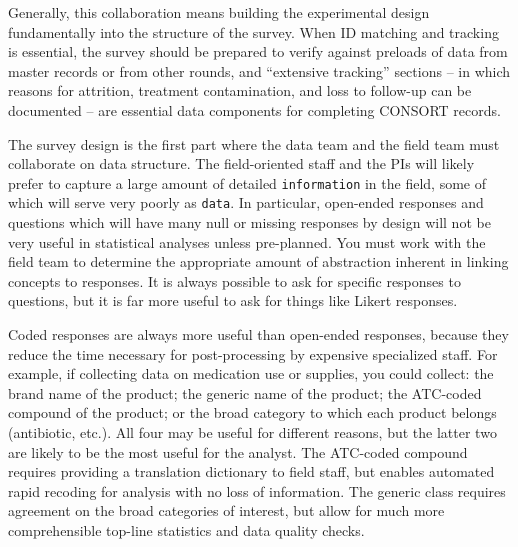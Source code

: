 Generally, this collaboration means building the experimental design
fundamentally into the structure of the survey.
When ID matching and tracking is essential,
the survey should be prepared to verify against preloads
of data from master records or from other rounds,
and ``extensive tracking'' sections --
in which reasons for attrition, treatment contamination, and
loss to follow-up can be documented --
are essential data components for completing CONSORT records.\cite{begg1996improving}

The survey design is the first part where the data team
and the field team must collaborate on data structure.
The field-oriented staff and the PIs will likely prefer
to capture a large amount of detailed \texttt{information}
in the field, some of which will serve very poorly as \texttt{data}.
In particular, open-ended responses and questions which will have
many null or missing responses by design will not be very useful
in statistical analyses unless pre-planned.
You must work with the field team to determine the appropriate amount
of abstraction inherent in linking concepts to responses.
It is always possible to ask for specific responses to questions,
but it is far more useful to ask for things like Likert responses.

Coded responses are always more useful than open-ended responses,
because they reduce the time necessary for post-processing by
expensive specialized staff.
For example, if collecting data on medication use or supplies,
you could collect: the brand name of the product;
the generic name of the product;
the ATC-coded compound of the product;
or the broad category to which each product belongs (antibiotic, etc.).
All four may be useful for different reasons,
but the latter two are likely to be the most useful for the analyst.
The ATC-coded compound requires providing a translation dictionary
to field staff, but enables automated rapid recoding for analysis
with no loss of information.
The generic class requires agreement on the broad categories of interest,
but allow for much more comprehensible top-line statistics and data quality checks.

